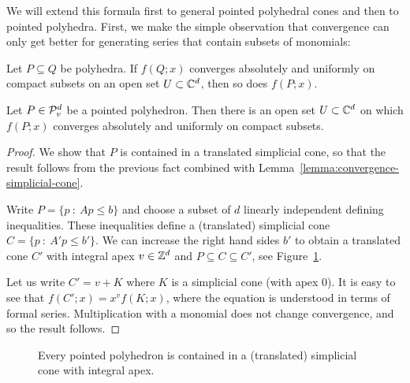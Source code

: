 We will extend this formula first to general pointed polyhedral cones and then to pointed polyhedra.
First, we make the simple observation that convergence can only get better for generating series
that contain subsets of monomials:

\begin{fact}
  \label{fact:polyhedra-subset-convergence-superset}
  Let $P \subseteq Q$ be polyhedra.
  If $f(Q;x)$ converges absolutely and uniformly on compact subsets on an open set $U \subset \mathbb{C}^d$,
  then so does $f(P;x)$.
\end{fact}

\begin{lemma}
  \label{lemma:series-pointed-converges}
  Let $P \in \mathcal{P}_v^d$ be a pointed polyhedron.
  Then there is an open set $U \subset \mathbb{C}^d$ on which
  $f(P;x)$ converges absolutely and uniformly on compact subsets.
\end{lemma}
\begin{proof}
  We show that $P$ is contained in a translated simplicial cone,
  so that the result follows from the previous fact combined with Lemma~\ref{lemma:convergence-simplicial-cone}.

  Write $P = \{ p ~:~ Ap \leq b \}$
  and choose a subset of $d$ linearly independent defining inequalities.
  These inequalities define a (translated) simplicial cone $C = \{ p ~:~ A'p \leq b' \}$.
  We can increase the right hand sides $b'$ to obtain a translated cone $C'$
  with integral apex $v \in \mathbb{Z}^d$ and $P \subseteq C \subseteq C'$, see Figure~\ref{fig:series-pointed-converges}.

  Let us write $C' = v + K$ where $K$ is a simplicial cone (with apex $0$).
  It is easy to see that $f(C';x) = x^v f(K;x)$,
  where the equation is understood in terms of formal series.
  Multiplication with a monomial does not change convergence,
  and so the result follows.
\end{proof}
\begin{figure}
  \begin{center}
  \end{center}
  \caption{Every pointed polyhedron is contained in a (translated) simplicial cone with integral apex.}
  \label{fig:series-pointed-converges}
\end{figure}

